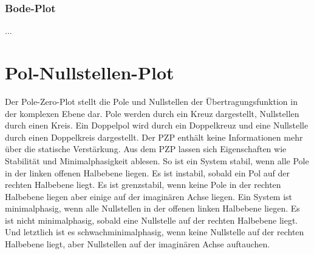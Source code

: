 \documentclass[
  ngerman
  ,12pt
  ,pdftex
]{article}
\begin{document}
\subsubsection{Bode-Plot}
...

\section{Pol-Nullstellen-Plot}
Der Pole-Zero-Plot stellt die Pole und Nullstellen der Übertragungsfunktion in der komplexen Ebene dar. Pole werden durch ein Kreuz dargestellt, Nullstellen durch einen Kreis. Ein Doppelpol wird durch ein Doppelkreuz und eine Nullstelle durch einen Doppelkreis dargestellt. Der PZP enthält keine Informationen mehr über die statische Verstärkung. Aus dem PZP lassen sich Eigenschaften wie Stabilität und Minimalphasigkeit ablesen. So ist ein System stabil, wenn alle Pole in der linken offenen Halbebene liegen. Es ist instabil, sobald ein Pol auf der rechten Halbebene liegt. Es ist grenzstabil, wenn keine Pole in der rechten Halbebene liegen aber einige auf der imaginären Achse liegen. Ein System ist minimalphasig, wenn alle Nullstellen in der offenen linken Halbebene liegen. Es ist nicht minimalphasig, sobald eine Nullstelle auf der rechten Halbebene liegt. Und letztlich ist es schwachminimalphasig, wenn keine Nullstelle auf der rechten Halbebene liegt, aber Nullstellen auf der imaginären Achse auftauchen.
\end{document}
